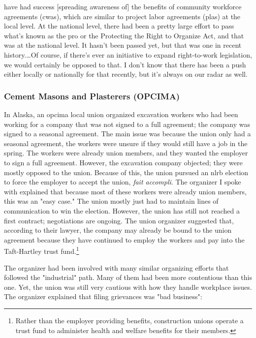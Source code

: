 \documentclass[12pt]{article}
\renewenvironment{quote}
  {\list{}{\leftmargin=\parindent\rightmargin=0pt}%
   \item\relax}
  {\endlist}
\begin{document}
\begin{quote}
[We] have had success [spreading awareness of] the benefits of community workforce agreements (\acrshort{cwa}s), which are similar to project labor agreements (\acrshort{pla}s) at the local level. At the national level, there had been a pretty large effort to pass what's known as the \acrshort{pro} or the Protecting the Right to Organize Act, and that was at the national level. It hasn't been passed yet, but that was one in recent history.\ldots{}Of course, if there's ever an initiative to expand right-to-work legislation, we would certainly be opposed to that. I don't know that there has been a push either locally or nationally for that recently, but it’s always on our radar as well.
\end{quote}

\subsubsection{Cement Masons and Plasterers (OPCIMA)}

In Alaska, an \acrfull{opcima} local union organized excavation workers who had been working for a company that was not signed to a full agreement; the company was signed to a seasonal agreement. The main issue was because the union only had a seasonal agreement, the workers were unsure if they would still have a job in the spring. The workers were already union members, and they wanted the employer to sign a full agreement. However, the excavation company objected; they were mostly opposed to the union. Because of this, the union pursued an \acrshort{nlrb} election to force the employer to accept the union, \textit{fait accompli}. The organizer I spoke with explained that because most of these workers were already union members, this was an "easy case." The union mostly just had to maintain lines of communication to win the election. However, the union has still not reached a first contract; negotiations are ongoing. The union organizer suggested that, according to their lawyer, the company may already be bound to the union agreement because they have continued to employ the workers and pay into the Taft-Hartley trust fund.\footnote{Rather than the employer providing benefits, construction unions operate a trust fund to administer health and welfare benefits for their members.}

The organizer had been involved with many similar organizing efforts that followed the "industrial" path. Many of them had been more contentious than this one. Yet, the union was still very cautious with how they handle workplace issues. The organizer explained that filing grievances was "bad business":
\end{document}
